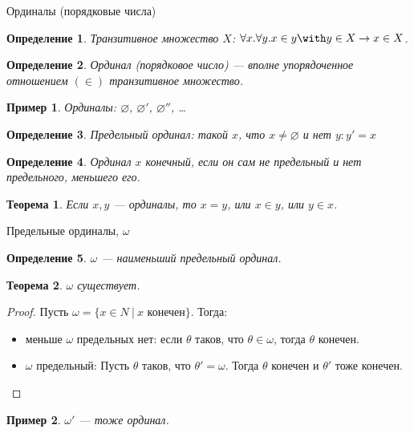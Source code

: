 \documentclass[aspectratio=169]{beamer}
\newtheorem{thm}{Теорема}[section]
\newtheorem{dfn}{Определение}[section]
\newtheorem{exm}{Пример}[section]
\begin{document}
\begin{frame}{Ординалы (порядковые числа)}
\begin{dfn}Транзитивное множество $X$: $\forall x.\forall y.x \in y \with y \in X \rightarrow x \in X$.\end{dfn}\pause
\begin{dfn}Ординал (порядковое число) --- вполне упорядоченное отношением $(\in)$ транзитивное множество.\end{dfn}\pause
\begin{exm}Ординалы: $\varnothing$, \pause $\varnothing'$, \pause $\varnothing''$, \dots\end{exm}\pause
\begin{dfn}Предельный ординал: такой $x$, что $x \ne \varnothing$ и нет $y: y' = x$\end{dfn}\pause
\begin{dfn}Ординал $x$ конечный, если он сам не предельный и нет предельного, меньшего его.\end{dfn}\pause
\begin{thm}Если $x,y$ --- ординалы, то $x = y$, или $x\in y$, или $y \in x$.\end{thm}
\end{frame}
\begin{frame}{Предельные ординалы, $\omega$}
\begin{dfn}$\omega$ --- наименьший предельный ординал.\end{dfn}\pause
\begin{thm}$\omega$ существует.\end{thm}\pause
\begin{proof}Пусть $\omega = \{ x \in N\ |\ x\text{ конечен}\}$. Тогда:
\begin{itemize}
\item меньше $\omega$ предельных нет: если $\theta$ таков, что $\theta \in \omega$, тогда $\theta$ конечен.\pause
\item $\omega$ предельный: Пусть $\theta$ таков, что $\theta' = \omega$. Тогда $\theta$ конечен и $\theta'$ тоже конечен.
\end{itemize}\end{proof}
\begin{exm}$\omega'$ --- тоже ординал.\end{exm}
\end{frame}
\end{document}
